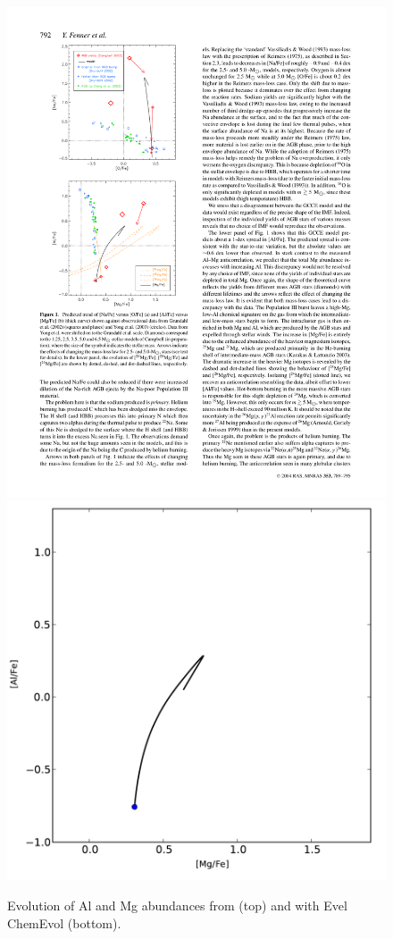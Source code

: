 \begin{figure}
 \begin{center}\includegraphics[height=0.45\textheight]{figures/Fenner04-Al-Mg}\\
 \includegraphics[height=0.45\textheight]{figures/cemodel-Al-Mg}\end{center}
 \caption{Evolution of Al and Mg abundances from \citet{Fenner:2004ju} (top) and with Evel ChemEvol (bottom).}\label{fig:cemodel-almg}
\end{figure}

